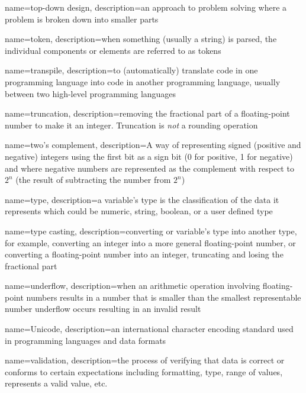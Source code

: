 {
  name=top-down design,
  description={an approach to problem solving where a problem is broken down into smaller parts}
}

{
  name=token,
  description={when something (usually a string) is parsed, the individual components or elements are referred to as tokens}
}

{
  name=transpile,
  description={to (automatically) translate code in one programming language into code in another programming language, usually between two high-level programming languages}
}

{
  name=truncation,
  description={removing the fractional part of a floating-point number to make it an integer.  Truncation is \emph{not} a 
  	rounding operation}
}

{
  name=two's complement,
  description={A way of representing signed (positive and negative) integers using the first bit as a sign bit (0 for positive, 1 for negative) and where negative numbers are represented as the complement with respect to $2^n$ (the result of subtracting the number from $2^n$) }
}

{
  name=type,
  description={a variable's type is the classification of the data it represents which could be numeric, string, boolean, or
  	a user defined type}
}

{
  name=type casting,
  description={converting or variable's type into another type, for example, converting an integer into a more general floating-point number, or
  	converting a floating-point number into an integer, truncating and losing the fractional part}
}

{
  name=underflow,
  description={when an arithmetic operation involving floating-point numbers results in a number that is smaller than the smallest representable
  number underflow occurs resulting in an invalid result}
}

{
  name=Unicode,
  description={an international character encoding standard used in programming languages and data formats}
}

{
  name=validation,
  description={the process of verifying that data is correct or conforms to certain expectations including formatting, type, range of values,
  	represents a valid value, etc.}
}

